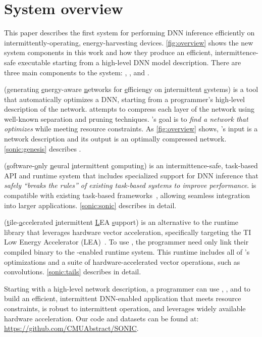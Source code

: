 \section{System overview}
\label{sonic:overview}

This paper describes the first system for performing DNN inference
efficiently on intermittently-operating, energy-harvest\-ing
devices. \autoref{fig:overview} shows the new system components in this work
and how they produce an efficient, intermittence-safe executable starting from
a high-level DNN model description.  There are three main components to the
system: \genesis, \sonic, and \tails.

\genesis ({\underline g}enerating {\underline e}nergy-aware {\underline n}etworks for {\underline
  e}fficien{\underline s}y on {\underline i}ntermittent {\underline s}ystems) is a tool that automatically
optimizes a DNN, starting from
a programmer's high-level description of the network.  \genesis attempts to compress each layer of the network using well-known separation and pruning techniques.
\genesis's goal is
to \emph{find a network that optimizes \metric}
while meeting resource
constraints.  As \autoref{fig:overview} shows, \genesis's input is
a network description and its output is an optimally compressed network. \autoref{sonic:genesis} describes \genesis.

\sonic ({\underline s}oftware-{\underline o}nly {\underline n}eural {\underline i}ntermittent {\underline
c}omputing) is an intermittence-safe,
task-based API and runtime system that
includes specialized support for DNN inference
that \emph{safely ``breaks the rules'' of existing task-based systems
to improve performance}.
\sonic is compatible with existing task-based
frameworks~\cite{chain,alpaca}, allowing seamless integration into larger applications.
% 
\autoref{sonic:sonic} describes \sonic in detail.

\tails ({\underline t}ile-{\underline a}ccelerated {\underline i}ntermittent {\underline L}EA {\underline
s}upport) is an alternative to the \sonic runtime library that
leverages hardware vector acceleration, specifically targeting the TI Low
Energy Accelerator (LEA)~\cite{lea}.  To use \tails, the
programmer need only link their compiled binary to the \tails-enabled
runtime system.  This runtime includes all of \sonic's optimizations and a
suite of hardware-accelerated vector operations, such as convolutions. 
% 
\autoref{sonic:tails} describes \tails in detail.

Starting with a high-level network description, a
programmer can use \genesis, \sonic, and \tails to build an efficient,
intermittent DNN-enabled application that meets resource constraints, is robust
to intermittent operation, and leverages widely available hardware acceleration.
Our code and datasets can be found at: \textsf{\href{https://github.com/CMUAbstract/SONIC}{https://github.com/CMUAbstract/SONIC}}. 
